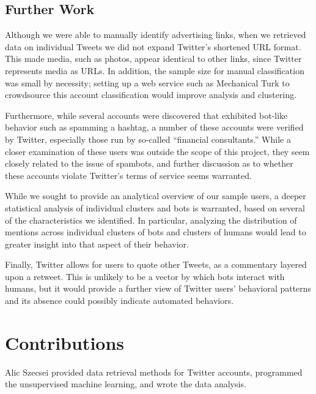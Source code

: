 \documentclass{sig-alternate-05-2015}
\begin{document}
\subsection{Further Work}
Although we were able to manually identify advertising links, when we retrieved data on individual Tweets we did not expand Twitter's shortened URL format. This made media, such as photos, appear identical to other links, since Twitter represents media as URLs. In addition, the sample size for manual classification was small by necessity; setting up a web service such as Mechanical Turk to crowdsource this account classification would improve analysis and clustering.

Furthermore, while several accounts were discovered that exhibited bot-like behavior such as spamming a hashtag, a number of these accounts were verified by Twitter, especially those run by so-called ``financial consultants.'' While a closer examination of these users was outside the scope of this project, they seem closely related to the issue of spambots, and further discussion as to whether these accounts violate Twitter's terms of service seems warranted.

While we sought to provide an analytical overview of our sample users, a deeper statistical analysis of individual clusters and bots is warranted, based on several of the characteristics we identified. In particular, analyzing the distribution of mentions across individual clusters of bots and clusters of humans would lead to greater insight into that aspect of their behavior.

Finally, Twitter allows for users to quote other Tweets, as a commentary layered upon a retweet. This is unlikely to be a vector by which bots interact with humans, but it would provide a further view of Twitter users' behavioral patterns and its absence could possibly indicate automated behaviors.

%

%
%

\appendix
\section{Contributions}
Alic Szecsei provided data retrieval methods for Twitter accounts, programmed the unsupervised machine learning, and wrote the data analysis.
\end{document}
